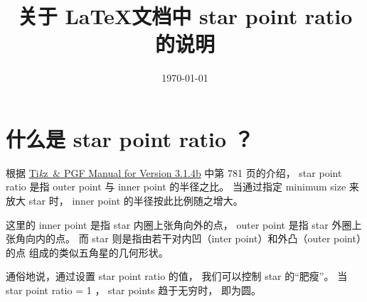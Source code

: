 \documentclass[UTF8]{ctexart}
\title{关于 \LaTeX 文档中 star point ratio 的说明}
\author{}
\date{\today}
\newcommand{\tikzprint}{Ti\emph{k}z}
\begin{document}
\maketitle

\section{什么是 star point ratio ？}
根据 \href{http://tug.org/svn/texlive/trunk/Master/texmf-dist/doc/%
generic/pgf/pgfmanual.pdf?revision=51817&view=co}
{\tikzprint~\& PGF Manual for Version 3.1.4b} 中第 781 页的介绍，
star point ratio 是指 outer point 与 inner point 的半径之比。
当通过指定 minimum size 来放大 star 时，
inner point 的半径按此比例随之增大。

这里的 inner point 是指 star 内圈上张角向外的点，
outer point 是指 star 外圈上张角向内的点。
而 star 则是指由若干对内凹（inter point）和外凸（outer point）的点
组成的类似五角星的几何形状。

通俗地说，通过设置 star point ratio 的值，
我们可以控制 star 的“肥瘦”。
当 star point ratio = 1 ，
star points 趋于无穷时，
即为圆。

\begin{center}
\end{center}
\end{document}
